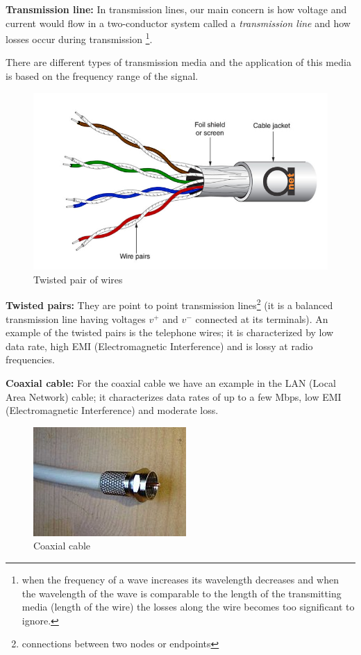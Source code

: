 \textbf{Transmission line:} In transmission lines, our main concern is how voltage and current would flow in a two-conductor system called a \textit{transmission line} and how losses occur during transmission \footnote{when the frequency of a wave increases its wavelength decreases and when the wavelength of the wave is comparable to the length of the transmitting media (length of the wire) the losses along the wire becomes too significant to ignore.}.

There are different types of transmission media and the application of this media is based on the frequency range of the signal. \begin{figure}[h]
\centering
\includegraphics[width=1\linewidth]{./graphics/twistedpairs}
\caption{Twisted pair of wires}
\end{figure} 

\textbf{Twisted pairs:} They are point to point transmission lines\footnote{connections between two nodes or endpoints} (it is a balanced transmission line having voltages $v^{+}$ and $v^{-}$ connected at its terminals). An example of the twisted pairs is the telephone wires; it is characterized by low data rate, high EMI (Electromagnetic Interference) and is lossy at radio frequencies.

\textbf{Coaxial cable:} For the coaxial cable we have an example in the LAN (Local Area Network) cable; it characterizes data rates of up to a few Mbps, low EMI (Electromagnetic Interference) and moderate loss.
\begin{figure}[h]
\centering
\includegraphics[scale=0.5]{./graphics/coaxialcable}
\caption{Coaxial cable}
\end{figure}

